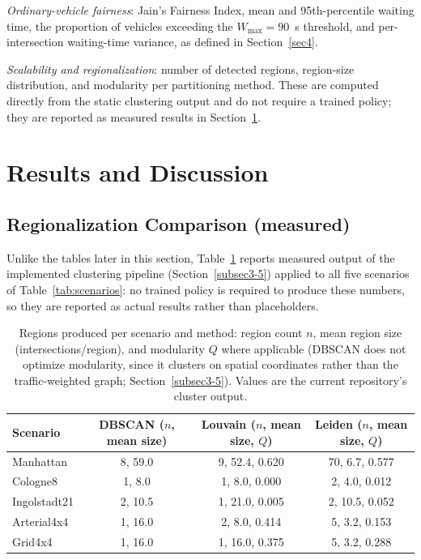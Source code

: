 \documentclass[3p,times]{elsarticle}
\theoremstyle{plain}
\theoremstyle{definition}
\begin{document}
\textit{Ordinary-vehicle fairness}: Jain's Fairness Index, mean and
95th-percentile waiting time, the proportion of vehicles exceeding the
$W_{\max}=90$~s threshold, and per-intersection waiting-time variance,
as defined in Section~\ref{sec4}.

\textit{Scalability and regionalization}: number of detected regions,
region-size distribution, and modularity per partitioning method. These
are computed directly from the static clustering output and do not
require a trained policy; they are reported as measured results in
Section~\ref{sec6}.



\section{Results and Discussion}\label{sec6}

\subsection{Regionalization Comparison (measured)}\label{subsec6-0}

Unlike the tables later in this section, Table~\ref{tab:regionalization}
reports measured output of the implemented clustering pipeline
(Section~\ref{subsec3-5}) applied to all five scenarios of
Table~\ref{tab:scenarios}: no trained policy is required to produce
these numbers, so they are reported as actual results rather than
placeholders.

\begin{table}[t]
\centering
\caption{Regions produced per scenario and method: region count $n$,
mean region size (intersections/region), and modularity $Q$ where
applicable (DBSCAN does not optimize modularity, since it clusters on
spatial coordinates rather than the traffic-weighted graph;
Section~\ref{subsec3-5}). Values are the current repository's cluster
output.}
\label{tab:regionalization}
\begin{tabular}{lccc}
\toprule
Scenario & DBSCAN ($n$, mean size) & Louvain ($n$, mean size, $Q$) & Leiden ($n$, mean size, $Q$) \\
\midrule
Manhattan    & 8, 59.0 & 9, 52.4, 0.620  & 70, 6.7, 0.577 \\
Cologne8     & 1, 8.0  & 1, 8.0, 0.000   & 2, 4.0, 0.012 \\
Ingolstadt21 & 2, 10.5 & 1, 21.0, 0.005  & 2, 10.5, 0.052 \\
Arterial4x4  & 1, 16.0 & 2, 8.0, 0.414   & 5, 3.2, 0.153 \\
Grid4x4      & 1, 16.0 & 1, 16.0, 0.375  & 5, 3.2, 0.288 \\
\bottomrule
\end{tabular}
\end{table}
\end{document}
